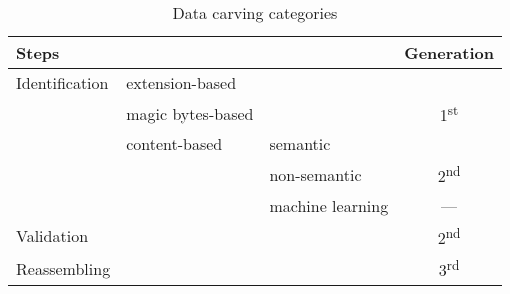 \begin{table*}[!ht]
    \centering
    \caption{Data carving categories}
    \label{tab:categories}
    \begin{tabular}{ l | l | l | c }
      \multicolumn{3}{l|}{Steps}                                 & Generation\\
      \hline\hline
      Identification    & extension-based   &                   &   \\
                        \cline{2-3}
                        & magic bytes-based &                   & \multirow{-2}{*}{1\textsuperscript{st}}\\
                        \cline{2-4}
                        & content-based     & semantic          &   \\
                                            \cline{3-3}
                        &                   & non-semantic      & \multirow{-2}{*}{2\textsuperscript{nd}}\\
                                            \cline{3-4}
                        &                   & machine learning  &  --- \\
      \hline
      Validation        &                   &                   & 2\textsuperscript{nd} \\
      \hline
      Reassembling      &                   &                   & 3\textsuperscript{rd}\\
      \hline
    \end{tabular}
\end{table*}